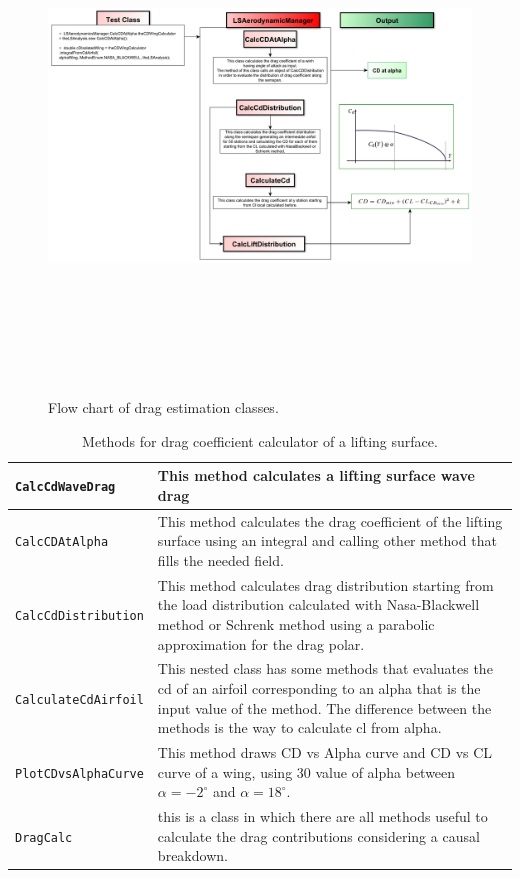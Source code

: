 \begin{figure}
\centering
{\includegraphics[height=12.9cm, angle=90]{immagini/dragflowchart.pdf}}
\caption{Flow chart of drag estimation classes.}
\label{fig:cd}
\end{figure}

\begin{table}[H]
\begin{tabular}{p{7cm}p{7.5cm}}
\toprule
\lstinline[language=Java]!CalcCdWaveDrag! & This method calculates a lifting surface wave drag\\ \hline 
\lstinline[language=Java]!CalcCDAtAlpha! & This method calculates the drag coefficient of the lifting surface using an integral and calling other method that fills the needed field. \\ \hline 
\lstinline[language=Java]!CalcCdDistribution! &This method calculates drag distribution starting from the load distribution calculated with Nasa-Blackwell method or Schrenk method using a parabolic approximation for the drag polar.  
\\ \hline 
\lstinline[language=Java]!CalculateCdAirfoil! & This nested class has some methods that evaluates the cd of an airfoil corresponding to an alpha that is the input value of the method. The difference between the methods is the way to calculate cl from alpha.\\ \hline 
\lstinline[language=Java]!PlotCDvsAlphaCurve! & This method draws CD vs Alpha curve and CD vs CL curve of a wing, using 30 value of alpha between $\alpha=- 2^{\circ}$ and $\alpha = 18^{\circ}$.\\ \hline 
\lstinline[language=Java]!DragCalc! & this is a class in which there are all methods useful to calculate the drag contributions considering a causal breakdown. \\ \hline 
\bottomrule
\end{tabular}
\caption{Methods for drag coefficient calculator of a lifting surface.}
\label{table:Table2}
\end{table}


